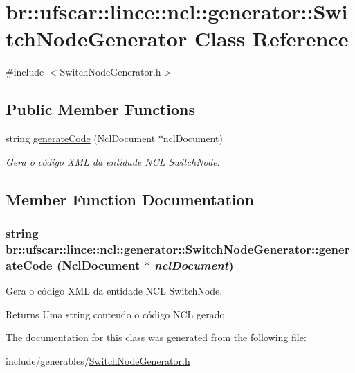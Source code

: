 \hypertarget{classbr_1_1ufscar_1_1lince_1_1ncl_1_1generator_1_1SwitchNodeGenerator}{
\section{br::ufscar::lince::ncl::generator::SwitchNodeGenerator Class Reference}
\label{classbr_1_1ufscar_1_1lince_1_1ncl_1_1generator_1_1SwitchNodeGenerator}
}


{\ttfamily \#include $<$SwitchNodeGenerator.h$>$}

\subsection*{Public Member Functions}
\begin{DoxyCompactItemize}
\item 
string \hyperlink{classbr_1_1ufscar_1_1lince_1_1ncl_1_1generator_1_1SwitchNodeGenerator_ab599f45deca3f0da0c58c4e1235c9894}{generateCode} (NclDocument $\ast$nclDocument)
\begin{DoxyCompactList}\small\item\em Gera o código XML da entidade NCL SwitchNode. \item\end{DoxyCompactList}\end{DoxyCompactItemize}


\subsection{Member Function Documentation}
\hypertarget{classbr_1_1ufscar_1_1lince_1_1ncl_1_1generator_1_1SwitchNodeGenerator_ab599f45deca3f0da0c58c4e1235c9894}{
\subsubsection[{generateCode}]{\setlength{\rightskip}{0pt plus 5cm}string br::ufscar::lince::ncl::generator::SwitchNodeGenerator::generateCode (NclDocument $\ast$ {\em nclDocument})}}
\label{classbr_1_1ufscar_1_1lince_1_1ncl_1_1generator_1_1SwitchNodeGenerator_ab599f45deca3f0da0c58c4e1235c9894}


Gera o código XML da entidade NCL SwitchNode. 

\begin{DoxyReturn}{Returns}
Uma string contendo o código NCL gerado. 
\end{DoxyReturn}


The documentation for this class was generated from the following file:\begin{DoxyCompactItemize}
\item 
include/generables/\hyperlink{SwitchNodeGenerator_8h}{SwitchNodeGenerator.h}\end{DoxyCompactItemize}
